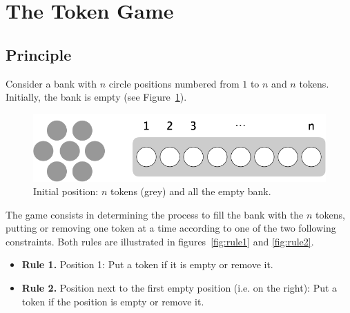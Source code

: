 \section{The Token Game}
\label{sec:TokenGame}

\subsection{Principle}


Consider a bank with $n$ circle positions numbered from $1$ to $n$ and $n$ tokens.
Initially, the bank is empty (see Figure~\ref{fig:jeujetonsInit}).

\begin{figure}[h]
\begin{center}
        \includegraphics[scale=0.4]{FiguresMaths/GameTokenInit.png}
        \caption{Initial position: $n$ tokens (grey) and all the empty bank.}
        \label{fig:jeujetonsInit}
\end{center}
\end{figure}

The game consists in determining the process to fill the bank with the $n$ tokens, putting or removing one token at a time according to one of the two 
following constraints.
Both rules are illustrated in figures~\ref{fig:rule1} and \ref{fig:rule2}.

\begin{itemize}
\item \textbf{Rule 1.} Position 1: Put a token if it is empty or remove it.
\item \textbf{Rule 2.} Position next to the first empty position (i.e. on the right): Put a token if the position is empty or remove it.
\end{itemize}


